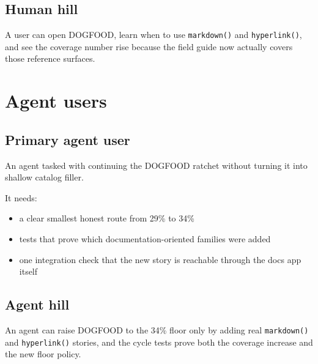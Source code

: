 \subsection{Human hill}\label{record-070-human-hill}

A user can open DOGFOOD, learn when to use \texttt{m\allowbreak{}a\allowbreak{}r\allowbreak{}k\allowbreak{}d\allowbreak{}o\allowbreak{}w\allowbreak{}n\allowbreak{}(\allowbreak{})} and \texttt{h\allowbreak{}y\allowbreak{}p\allowbreak{}e\allowbreak{}r\allowbreak{}l\allowbreak{}i\allowbreak{}n\allowbreak{}k\allowbreak{}(\allowbreak{})}, and see the coverage number rise because the field guide now actually covers those reference surfaces.

\section{Agent users}\label{record-070-agent-users}

\subsection{Primary agent user}\label{record-070-primary-agent-user}

An agent tasked with continuing the DOGFOOD ratchet without turning it into shallow catalog filler.

It needs:

\begin{itemize}
\tightlist
\item
  a clear smallest honest route from 29\% to 34\%
\item
  tests that prove which documentation-oriented families were added
\item
  one integration check that the new story is reachable through the docs app itself
\end{itemize}

\subsection{Agent hill}\label{record-070-agent-hill}

An agent can raise DOGFOOD to the 34\% floor only by adding real \texttt{m\allowbreak{}a\allowbreak{}r\allowbreak{}k\allowbreak{}d\allowbreak{}o\allowbreak{}w\allowbreak{}n\allowbreak{}(\allowbreak{})} and \texttt{h\allowbreak{}y\allowbreak{}p\allowbreak{}e\allowbreak{}r\allowbreak{}l\allowbreak{}i\allowbreak{}n\allowbreak{}k\allowbreak{}(\allowbreak{})} stories, and the cycle tests prove both the coverage increase and the new floor policy.

